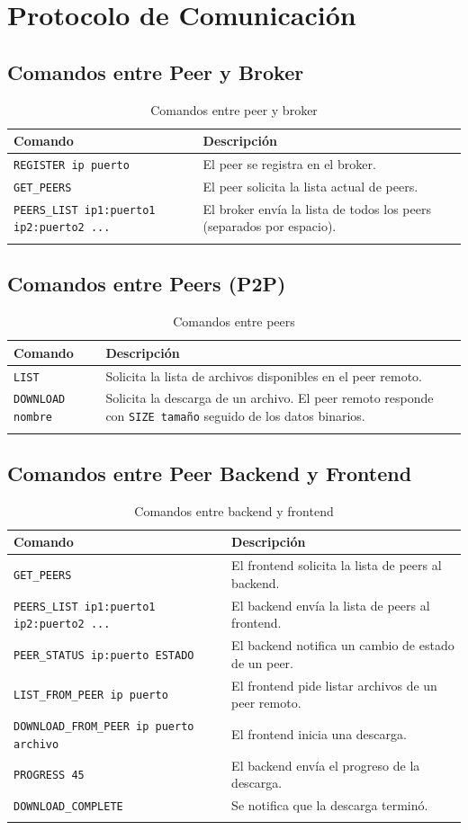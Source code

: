 \documentclass[12pt]{article}
\begin{document}
\section{Protocolo de Comunicación}

\subsection{Comandos entre Peer y Broker}
\begin{longtable}{|p{3cm}|p{8cm}|}
\hline
\textbf{Comando} & \textbf{Descripción} \\
\hline
\texttt{REGISTER ip puerto} & El peer se registra en el broker. \\
\texttt{GET\_PEERS} & El peer solicita la lista actual de peers. \\
\texttt{PEERS\_LIST ip1:puerto1 ip2:puerto2 ...} & El broker envía la lista de todos los peers (separados por espacio). \\
\hline
\caption{Comandos entre peer y broker}
\end{longtable}

\subsection{Comandos entre Peers (P2P)}
\begin{longtable}{|p{3cm}|p{8cm}|}
\hline
\textbf{Comando} & \textbf{Descripción} \\
\hline
\texttt{LIST} & Solicita la lista de archivos disponibles en el peer remoto. \\
\texttt{DOWNLOAD nombre} & Solicita la descarga de un archivo. El peer remoto responde con \texttt{SIZE tamaño} seguido de los datos binarios. \\
\hline
\caption{Comandos entre peers}
\end{longtable}

\subsection{Comandos entre Peer Backend y Frontend}
\begin{longtable}{|p{3cm}|p{8cm}|}
\hline
\textbf{Comando} & \textbf{Descripción} \\
\hline
\texttt{GET\_PEERS} & El frontend solicita la lista de peers al backend. \\
\texttt{PEERS\_LIST ip1:puerto1 ip2:puerto2 ...} & El backend envía la lista de peers al frontend. \\
\texttt{PEER\_STATUS ip:puerto ESTADO} & El backend notifica un cambio de estado de un peer. \\
\texttt{LIST\_FROM\_PEER ip puerto} & El frontend pide listar archivos de un peer remoto. \\
\texttt{DOWNLOAD\_FROM\_PEER ip puerto archivo} & El frontend inicia una descarga. \\
\texttt{PROGRESS 45} & El backend envía el progreso de la descarga. \\
\texttt{DOWNLOAD\_COMPLETE} & Se notifica que la descarga terminó. \\
\hline
\caption{Comandos entre backend y frontend}
\end{longtable}
\end{document}
